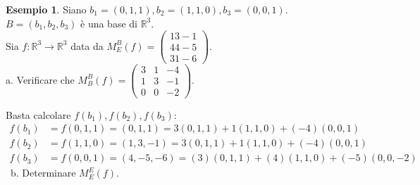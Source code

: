 \documentclass[a4paper]{article}
\theoremstyle{definition}
\newtheorem*{es}{Esempio}
\begin{document}
\begin{es}
	Siano $b_1 = (0, 1, 1), b_2 = (1, 1, 0), b_3 = (0, 0, 1)$. $B = (b_1, b_2, b_3)$ è una base di $\mathbb{R}^3$. \\
	Sia $f: \mathbb{R}^3 \rightarrow \mathbb{R}^3$ data da $M_E^B(f) = \begin{pmatrix}
			1 3 -1 \\
			4 4 -5 \\
			3 1 -6
		\end{pmatrix}$. \\
	a. Verificare che $M_B^B(f) = \begin{pmatrix}
			3 & 1 & -4 \\
			1 & 3 & -1 \\
			0 & 0 & -2
		\end{pmatrix}$.

	Basta calcolare $f(b_1), f(b_2), f(b_3)$:
	\begin{align*}
		f(b_1) & = f(0, 1, 1) = (0, 1, 1) = 3(0, 1, 1) + 1(1, 1, 0) + (-4)(0, 0, 1) \\
		f(b_2) & = f(1, 1, 0) = (1, 3, -1) = 3(0, 1, 1) + 1(1, 1, 0) + (-4)(0, 0, 1) \\
		f(b_3) & = f(0, 0, 1) = (4, -5, -6) = (3)(0, 1, 1) + (4)(1, 1, 0) + (-5)(0, 0, -2)
	\end{align*}
	\
	b. Determinare $M_E^E(f)$.


\end{es}
\end{document}
